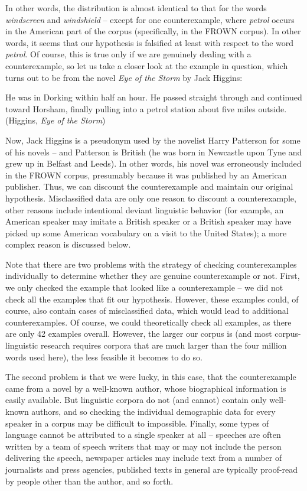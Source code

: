 In other words, the distribution is almost identical to that for the words \textit{windscreen} and \textit{windshield} -- except for one counterexample, where \textit{petrol} occurs in the American part of the corpus (specifically, in the FROWN corpus). In other words, it seems that our hypothesis is falsified at least with respect to the word \textit{petrol}. Of course, this is true only if we are genuinely dealing with a counterexample, so let us take a closer look at the example in question, which turns out to be from the novel \textit{Eye of the Storm} by Jack Higgins:

\begin{exe}
\ex He was in Dorking within half an hour. He passed straight through and continued toward Horsham, finally pulling into a petrol station about five miles outside. (Higgins, \textit{Eye of the Storm})
\label{ex:higginspetrol}
\end{exe}

Now, Jack Higgins is a pseudonym used by the novelist Harry Patterson for some of his novels -- and Patterson is British (he was born in Newcastle upon Tyne and grew up in Belfast and Leeds). In other words, his novel was erroneously included in the FROWN corpus, presumably because it was published by an American publisher. Thus, we can discount the counterexample and maintain our original hypothesis. Misclassified data are only one reason to discount a counterexample, other reasons include intentional deviant linguistic behavior (for example, an American speaker may imitate a British speaker or a British speaker may have picked up some American vocabulary on a visit to the United States); a more complex reason is discussed below.

Note that there are two problems with the strategy of checking counterexamples individually to determine whether they are genuine counterexample or not. First, we only checked the example that looked like a counterexample -- we did not check all the examples that fit our hypothesis. However, these examples could, of course, also contain cases of misclassified data, which would lead to additional counterexamples. Of course, we could theoretically check all examples, as there are only 42 examples overall. However, the larger our corpus is (and most corpus-linguistic research requires corpora that are much larger than the four million words used here), the less feasible it becomes to do so.

The second problem is that we were lucky, in this case, that the counterexample came from a novel by a well-known author, whose biographical information is easily available. But linguistic corpora do not (and cannot) contain only well-known authors, and so checking the individual demographic data for every speaker in a corpus may be difficult to impossible. Finally, some types of language cannot be attributed to a single speaker at all -- speeches are often written by a team of speech writers that may or may not include the person delivering the speech, newspaper articles may include text from a number of journalists and press agencies, published texts in general are typically proof-read by people other than the author, and so forth.

